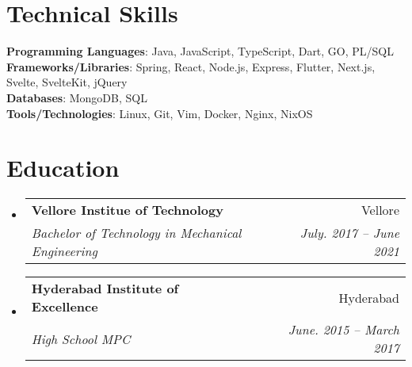 \documentclass[letterpaper,11pt]{article}
\makeatletter
\newcommand{\resumeSubheading}[4]{
  \vspace{-2pt}\item
    \begin{tabular*}{0.97\textwidth}[t]{l@{\extracolsep{\fill}}r}
      \textbf{#1} & #2 \\
      \textit{\small#3} & \textit{\small #4} \\
    \end{tabular*}\vspace{-7pt}
}
\newcommand{\resumeSubHeadingListStart}{\begin{itemize}[leftmargin=0.15in, label={}]}
\newcommand{\resumeSubHeadingListEnd}{\end{itemize}}
\makeatother
\begin{document}
\section{Technical Skills}
 \begin{itemize}[leftmargin=0.15in, label={}]
    \small{\item{
     \textbf{Programming Languages}{: Java, JavaScript, TypeScript, Dart, GO,  PL/SQL} \\
     \textbf{Frameworks/Libraries}{: Spring, React, Node.js, Express, Flutter, Next.js, Svelte, SvelteKit, jQuery} \\
     \textbf{Databases}{: MongoDB, SQL} \\
     \textbf{Tools/Technologies}{: Linux, Git, Vim, Docker, Nginx, NixOS } \\
    }}
 \end{itemize}
    
\section{Education}
  \resumeSubHeadingListStart
    \resumeSubheading
      {Vellore Institue of Technology}{Vellore}
      {Bachelor of Technology in Mechanical Engineering}{July. 2017 -- June 2021}
    \resumeSubheading
      {Hyderabad Institute of Excellence}{Hyderabad}
      {High School MPC}{June. 2015 -- March 2017}
  \resumeSubHeadingListEnd


%



\end{document}
